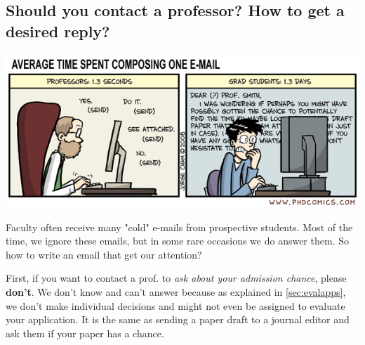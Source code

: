\documentclass[oneside,11pt]{memoir}
\begin{document}


\subsection{Should you contact a professor? How to get a desired reply?}\label{sec:contact}


\begin{center}
  \includegraphics[scale=0.6]{files/emails.png}
\end{center}


Faculty often receive many "cold" e-mails from prospective students. Most of the time, we ignore these emails, but in some rare occasions we do answer them. So how to write an email that get our attention?



First, if you want to contact a prof. to \emph{ask about your admission chance}, please \textbf{don't}. We don't know and can't answer because as explained in \autoref{sec:evalapps}, we don't make individual decisions and might not even be assigned to evaluate your application.  It is the same as sending a paper draft to a journal editor and ask them if your paper has a chance.
\end{document}
